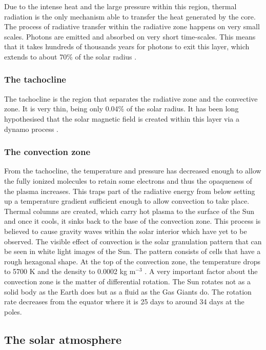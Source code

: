     Due to the intense heat and the large pressure within this region, thermal radiation is the only mechanism able to transfer the heat generated by the core.
    The process of radiative transfer within the radiative zone happens on very small scales.
    Photons are emitted and absorbed on very short time-scales. 
    This means that it takes hundreds of thousands years for photons to exit this layer, which extends to about 70\% of the solar radius \citep{cox1991solar}. 
        
\subsubsection{The tachocline}

    The tachocline is the region that separates the radiative zone and the convective zone.
    It is very thin, being only 0.04\% of the solar radius.
    It has been long hypothesised that the solar magnetic field is created within this layer via a dynamo process \citep{soward2005fluid}.

\subsubsection{The convection zone}

    From the tachocline, the temperature and pressure has decreased enough to allow the fully ionized molecules to retain some electrons and thus the opaqueness of the plasma increases.
    This traps part of the radiative energy from below setting up a temperature gradient sufficient enough to allow convection to take place.
    Thermal columns are created, which carry hot plasma to the surface of the Sun and once it cools, it sinks back to the base of the convection zone.
    This process is believed to cause gravity waves within the solar interior which have yet to be observed.
    The visible effect of convection is the solar granulation pattern that can be seen in white light images of the Sun.  
    The pattern consists of cells that have a rough hexagonal shape. 
    At the top of the convection zone, the temperature drops to 5700 K and the density to 0.0002 kg m$^{-3}$ \citep{gai2000sun}. 
    A very important factor about the convection zone is the matter of differential rotation.
    The Sun rotates not as a solid body as the Earth does but as a fluid as the Gas Giants do. 
    The rotation rate decreases from the equator where it is 25 days to around 34 days at the poles.
    
\subsection{The solar atmosphere}
 
